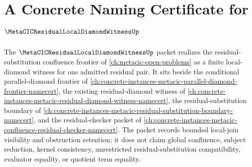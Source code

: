 \chapter{A Concrete Naming Certificate for $\MetaCICResidualLocalDiamondWitnessUp$}
\label{ch:concrete-instances-metacic-residual-local-diamond-witness-namecert}

The $\MetaCICResidualLocalDiamondWitnessUp$ packet realizes the residual-substitution confluence frontier of \autoref{ch:metacic-open-problems} as a finite local-diamond witness for one admitted residual pair. It sits beside the conditional parallel-diamond frontier of \autoref{ch:concrete-instances-metacic-parallel-diamond-frontier-namecert}, the existing residual-diamond witness of \autoref{ch:concrete-instances-metacic-residual-diamond-witness-namecert}, the residual-substitution boundary of \autoref{ch:concrete-instances-metacic-residual-substitution-boundary-namecert}, and the residual-checker packet of \autoref{ch:concrete-instances-metacic-confluence-residual-checker-namecert}. The packet records bounded local-join visibility and obstruction retention; it does not claim global confluence, subject reduction, kernel consistency, unrestricted residual-substitution compatibility, evaluator equality, or quotient term equality.

